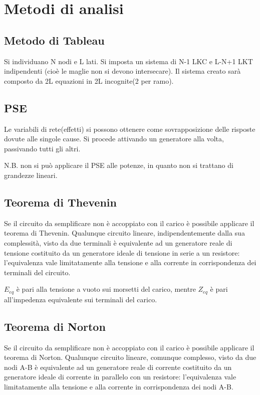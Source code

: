 \documentclass{article}
\begin{document}
\section{Metodi di analisi}
\subsection{Metodo di Tableau}
\noindent Si individuano N nodi e L lati. Si imposta un sistema di N-1 LKC e L-N+1 LKT indipendenti (cioè le maglie non si devono
 intersecare). Il sistema creato sarà composto da 2L equazioni in 2L incognite(2 per ramo).
\subsection{PSE}
Le variabili di rete(effetti) si possono ottenere come sovrapposizione delle risposte dovute alle singole cause. Si procede attivando un 
generatore alla volta, passivando tutti gli altri.

\noindent N.B. non si può applicare il PSE alle potenze, in quanto non si trattano di grandezze lineari.

\subsection{Teorema di Thevenin}
Se il circuito da semplificare non è accoppiato con il carico è possibile applicare il teorema di Thevenin. 
Qualunque circuito lineare, indipendentemente dalla sua complessità, visto da due terminali è equivalente ad un generatore reale di tensione
costituito da un generatore ideale di tensione in serie a un resistore: l'equivalenza vale limitatamente alla tensione e alla corrente
in corrispondenza dei terminali del circuito.

\noindent $E_{eq}$ è pari alla tensione a vuoto sui morsetti del carico, mentre $Z_{eq}$ è pari all'impedenza equivalente sui terminali del carico.

\subsection{Teorema di Norton}
Se il circuito da semplificare non è accoppiato con il carico è possibile applicare il teorema di Norton. 
Qualunque circuito lineare, comunque complesso, visto da due nodi A-B è equivalente ad un generatore reale di corrente costituito
da un generatore ideale di corrente in parallelo con un resistore: l'equivalenza vale limitatamente alla tensione e alla corrente in 
corrispondenza dei nodi A-B.
\end{document}
